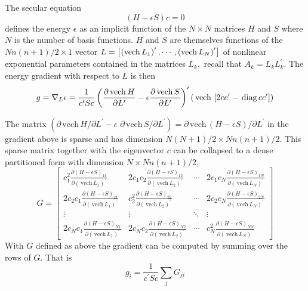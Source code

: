 \documentclass[12pt,doublespace]{article}
\begin{document}
The secular equation 
\begin{equation}
\left( H-\epsilon S\right) c=0
\end{equation}
defines the energy $\epsilon $ as an implicit function of the $N\times N$
matrices $H$ and $S$ where $N$ is the number of basis functions. $H$ and $S$
are themselves functions of the $Nn\left( n+1\right) /2\times 1$ vector $L=%
\left[ \left( \mathrm{vech}\,L_{1}\right) ^{\prime },\cdots ,\left( \mathrm{%
vech}\,L_{N}\right) ^{\prime }\right] $ of nonlinear exponential parameters
contained in the matrices $L_{k},$ recall that $A_{k}=L_{k}L_{k}^{\prime }$.
The energy gradient with respect to $L$ is then 
\begin{equation}
g=\nabla _{L}\epsilon =\frac{1}{c^{\prime }Sc}\left( \frac{\partial \,%
\mathrm{vech}\,H}{\partial L^{\prime }}-\epsilon \frac{\partial \,\mathrm{%
vech}\,S}{\partial L^{\prime }}\right) ^{\prime }\left( \,\mathrm{vech}\,%
\left[ 2cc^{\prime }-\,\mathrm{diag}\,cc^{\prime }\right] \right)
\label{grad}
\end{equation}

The matrix $\left( \partial \,\mathrm{vech}\,H/\partial L^{\prime }-\epsilon
\,\,\partial \,\mathrm{vech}\,S/\partial L^{\prime }\right) =\partial \,%
\mathrm{vech}\,\left( H-\epsilon S\right) /\partial L^{\prime }$ in the
gradient above is sparse and has dimension $N\left( N+1\right) /2\times
Nn\left( n+1\right) /2$. This sparse matrix together with the eigenvector $c$
can be collapsed to a dense partitioned form with dimension $N\times
Nn\left( n+1\right) /2$, 
\begin{equation}
G=\left[ 
\begin{array}{cccc}
c_{1}^{2}\frac{\partial \left( H-\epsilon S\right) _{11}}{\partial \left( \,%
\mathrm{vech}\,L_{1}\right) ^{\prime }} & 2c_{1}c_{2}\frac{\partial \left(
H-\epsilon S\right) _{12}}{\partial \left( \,\mathrm{vech}\,L_{2}\right)
^{\prime }} & \cdots & 2c_{1}c_{N}\frac{\partial \left( H-\epsilon S\right)
_{1N}}{\partial \left( \,\mathrm{vech}\,L_{N}\right) ^{\prime }} \\ 
2c_{2}c_{1}\frac{\partial \left( H-\epsilon S\right) _{21}}{\partial \left(
\,\mathrm{vech}\,L_{1}\right) ^{\prime }} & c_{2}^{2}\frac{\partial \left(
H-\epsilon S\right) _{22}}{\partial \left( \,\mathrm{vech}\,L_{2}\right)
^{\prime }} & \cdots & 2c_{2}c_{N}\frac{\partial \left( H-\epsilon S\right)
_{2N}}{\partial \left( \,\mathrm{vech}\,L_{N}\right) ^{\prime }} \\ 
\vdots & \vdots & \ddots & \vdots \\ 
2c_{N}c_{1}\frac{\partial \left( H-\epsilon S\right) _{N1}}{\partial \left(
\,\mathrm{vech}\,L_{1}\right) ^{\prime }} & 2c_{N}c_{2}\frac{\partial \left(
H-\epsilon S\right) _{N2}}{\partial \left( \,\mathrm{vech}\,L_{2}\right)
^{\prime }} & \cdots & c_{N}^{2}\frac{\partial \left( H-\epsilon S\right)
_{NN}}{\partial \left( \,\mathrm{vech}\,L_{N}\right) ^{\prime }}
\end{array}
\right]
\end{equation}
With $G$ defined as above the gradient can be computed by summing over the
rows of $G$. That is 
\begin{equation*}
g_{i}=\frac{1}{c^{\prime }Sc}\sum_{j}G_{ji}
\end{equation*}
\end{document}
